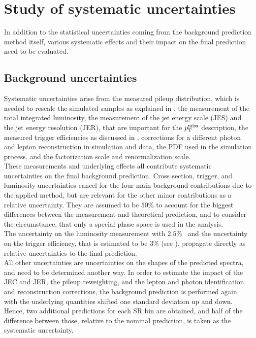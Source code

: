 \section{Study of systematic uncertainties}\label{sec:Syst}
In addition to the statistical uncertainties coming from the background prediction method itself, various systematic effects and their impact on the final prediction need to be evaluated.

\subsection{Background uncertainties}
Systematic uncertainties arise from the measured pileup distribution,  which is needed to rescale the simulated samples as explained in , the measurement of the total integrated luminosity, the measurement of the jet energy scale (JES) and the jet energy resolution (JER), that are important for the $p_{\mathrm{T}}^\text{miss}$ description, the measured trigger efficiencies as discussed in , corrections for a different photon and lepton reconstruction in simulation and data, the PDF used in the simulation process, and the factorization scale and renormalization scale.\\
These measurements and underlying effects all contribute systematic uncertainties on the final background prediction. Cross section, trigger, and luminosity uncertainties cancel for the four main background contributions due to the applied method, but are relevant for the other minor contributions as a relative uncertainty. They are assumed to be $50\%$ to account for the biggest differences between the measurement and theoretical prediction, and to consider the circumstance, that only a special phase space is used in the analysis.\\
The uncertainty on the luminosity measurement with $2.5\%$~\cite{LumiUncert} and the uncertainty on the trigger efficiency, that is estimated to be $3\%$ (see ), propagate directly as relative uncertainties to the final prediction.\\
All other uncertainties are uncertainties on the shapes of the predicted spectra, and need to be determined another way. In order to estimate the impact of the JEC and JER, the pileup reweighting, and the lepton and photon identification and reconstruction corrections, the background prediction is performed again with the underlying quantities shifted one standard deviation up and down. Hence, two additional predictions for each SR bin are obtained, and half of the difference between those, relative to the nominal prediction, is taken as the systematic uncertainty.\\
